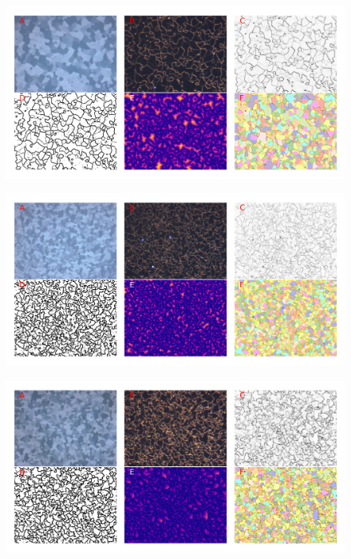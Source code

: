 \documentclass[12pt, titlepage]{article}
\begin{document}
	\begin{figure}[h]
		\centering
		\includegraphics[width=1.0\linewidth]{microstructure_15C.png}
		\caption{}
		\label{fig:micro_15C}
	\end{figure}

	\begin{figure}[h]
		\centering
		\includegraphics[width=1.0\linewidth]{microstructure_20C.png}
		\caption{}
		\label{fig:micro_20C}
	\end{figure}

	\begin{figure}[h]
		\centering
		\includegraphics[width=1.0\linewidth]{microstructure_25C.png}
		\caption{}
		\label{fig:micro_25C}
	\end{figure}
\end{document}
